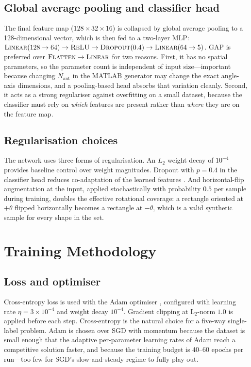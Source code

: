 \documentclass[letterpaper,11pt,leqno]{article}
\begin{document}
\subsection{Global average pooling and classifier head}

The final feature map ($128\times 32\times 16$) is collapsed by global average pooling \citep{Lin14} to a 128-dimensional vector, which is then fed to a two-layer MLP: $\textsc{Linear}(128\to 64)\to\textsc{ReLU}\to\textsc{Dropout}(0.4)\to\textsc{Linear}(64\to 5)$. GAP is preferred over $\textsc{Flatten}\to\textsc{Linear}$ for two reasons. First, it has no spatial parameters, so the parameter count is independent of input size---important because changing $N_{\mathrm{ant}}$ in the MATLAB generator may change the exact angle-axis dimensions, and a pooling-based head absorbs that variation cleanly. Second, it acts as a strong regulariser against overfitting on a small dataset, because the classifier must rely on \emph{which} features are present rather than \emph{where} they are on the feature map.

\subsection{Regularisation choices}

The network uses three forms of regularisation. An $L_2$ weight decay of $10^{-4}$ provides baseline control over weight magnitudes. Dropout with $p=0.4$ in the classifier head reduces co-adaptation of the learned features \citep{Srivastava14}. And horizontal-flip augmentation at the input, applied stochastically with probability $0.5$ per sample during training, doubles the effective rotational coverage: a rectangle oriented at $+\theta$ flipped horizontally becomes a rectangle at $-\theta$, which is a valid synthetic sample for every shape in the set.

\section{Training Methodology}\label{s:training}

\subsection{Loss and optimiser}

Cross-entropy loss is used with the Adam optimiser \citep{Kingma15}, configured with learning rate $\eta=3\times 10^{-4}$ and weight decay $10^{-4}$. Gradient clipping at L$_2$-norm $1.0$ is applied before each step. Cross-entropy is the natural choice for a five-way single-label problem. Adam is chosen over SGD with momentum because the dataset is small enough that the adaptive per-parameter learning rates of Adam reach a competitive solution faster, and because the training budget is 40--60 epochs per run---too few for SGD's slow-and-steady regime to fully play out.
\end{document}
